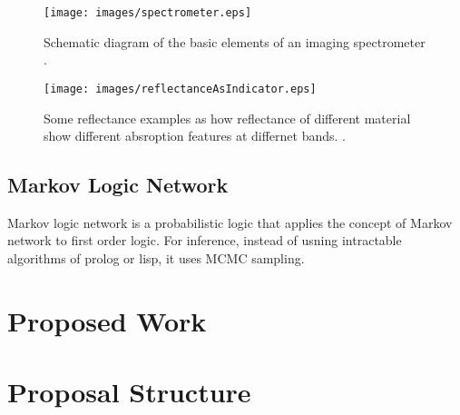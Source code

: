 \begin{figure}[htbp]
\label{Imaging spectrometer}
  \centering
    \texttt{[image: images/spectrometer.eps]}
    \caption[Imaging spectrometer schematic diagram]{Schematic diagram of the basic elements of an imaging spectrometer \citep{smith2006introduction}.}
\end{figure}

\begin{figure}[htbp]
\label{Imaging spectrometer}
  \centering
    \texttt{[image: images/reflectanceAsIndicator.eps]}
    \caption[Some reflectance examples]{Some reflectance examples as how reflectance of different material show different absroption features at differnet bands. \citep{smith2006introduction}.}
\end{figure}

%

\subsection{Markov Logic Network}
Markov logic network is a probabilistic logic that applies the concept of Markov network to first order logic. For inference, instead of usning intractable algorithms of prolog or lisp, it uses MCMC sampling.

\section{Proposed Work}

\section{Proposal Structure}

